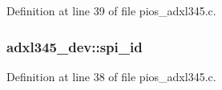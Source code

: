 Definition at line 39 of file pios\-\_\-adxl345.\-c.

\hypertarget{group___p_i_o_s___a_d_x_l345_ga2681cf2ea08ddf51ce6cea962e6ea9a7}{
\subsubsection[{spi\-\_\-id}]{ adxl345\-\_\-dev\-::spi\-\_\-id}}\label{group___p_i_o_s___a_d_x_l345_ga2681cf2ea08ddf51ce6cea962e6ea9a7}


Definition at line 38 of file pios\-\_\-adxl345.\-c.

